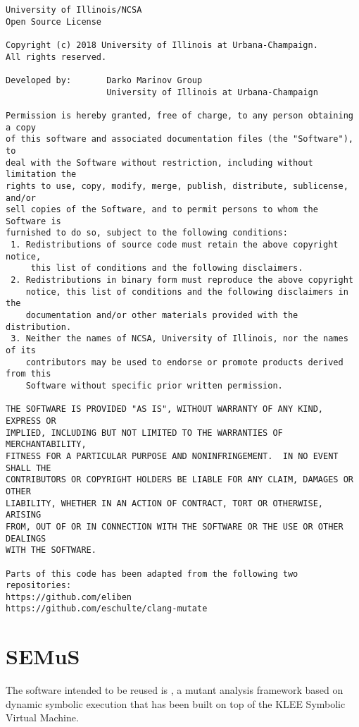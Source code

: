 \begin{lstlisting}[language={}]
University of Illinois/NCSA
Open Source License

Copyright (c) 2018 University of Illinois at Urbana-Champaign.
All rights reserved.

Developed by:       Darko Marinov Group
                    University of Illinois at Urbana-Champaign

Permission is hereby granted, free of charge, to any person obtaining a copy
of this software and associated documentation files (the "Software"), to
deal with the Software without restriction, including without limitation the
rights to use, copy, modify, merge, publish, distribute, sublicense, and/or
sell copies of the Software, and to permit persons to whom the Software is
furnished to do so, subject to the following conditions:
 1. Redistributions of source code must retain the above copyright notice,
     this list of conditions and the following disclaimers.
 2. Redistributions in binary form must reproduce the above copyright
    notice, this list of conditions and the following disclaimers in the
    documentation and/or other materials provided with the distribution.
 3. Neither the names of NCSA, University of Illinois, nor the names of its
    contributors may be used to endorse or promote products derived from this
    Software without specific prior written permission.

THE SOFTWARE IS PROVIDED "AS IS", WITHOUT WARRANTY OF ANY KIND, EXPRESS OR
IMPLIED, INCLUDING BUT NOT LIMITED TO THE WARRANTIES OF MERCHANTABILITY,
FITNESS FOR A PARTICULAR PURPOSE AND NONINFRINGEMENT.  IN NO EVENT SHALL THE
CONTRIBUTORS OR COPYRIGHT HOLDERS BE LIABLE FOR ANY CLAIM, DAMAGES OR OTHER
LIABILITY, WHETHER IN AN ACTION OF CONTRACT, TORT OR OTHERWISE, ARISING
FROM, OUT OF OR IN CONNECTION WITH THE SOFTWARE OR THE USE OR OTHER DEALINGS
WITH THE SOFTWARE.

Parts of this code has been adapted from the following two repositories:
https://github.com/eliben
https://github.com/eschulte/clang-mutate
\end{lstlisting}

\section{SEMuS}
\label{sec:semus:reuse}

The software intended to be reused is \SEMU, a mutant analysis framework based on dynamic symbolic execution that has been built on top of the KLEE Symbolic Virtual Machine.

